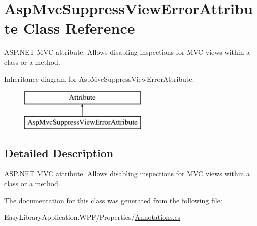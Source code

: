 \hypertarget{class_asp_mvc_suppress_view_error_attribute}{}\section{Asp\+Mvc\+Suppress\+View\+Error\+Attribute Class Reference}
\label{class_asp_mvc_suppress_view_error_attribute}


A\+S\+P.\+N\+ET M\+VC attribute. Allows disabling inspections for M\+VC views within a class or a method.  


Inheritance diagram for Asp\+Mvc\+Suppress\+View\+Error\+Attribute\+:\begin{figure}[H]
\begin{center}
\leavevmode
\includegraphics[height=2.000000cm]{class_asp_mvc_suppress_view_error_attribute}
\end{center}
\end{figure}


\subsection{Detailed Description}
A\+S\+P.\+N\+ET M\+VC attribute. Allows disabling inspections for M\+VC views within a class or a method. 



The documentation for this class was generated from the following file\+:\begin{DoxyCompactItemize}
\item 
Easy\+Library\+Application.\+W\+P\+F/\+Properties/\mbox{\hyperlink{_annotations_8cs}{Annotations.\+cs}}\end{DoxyCompactItemize}
